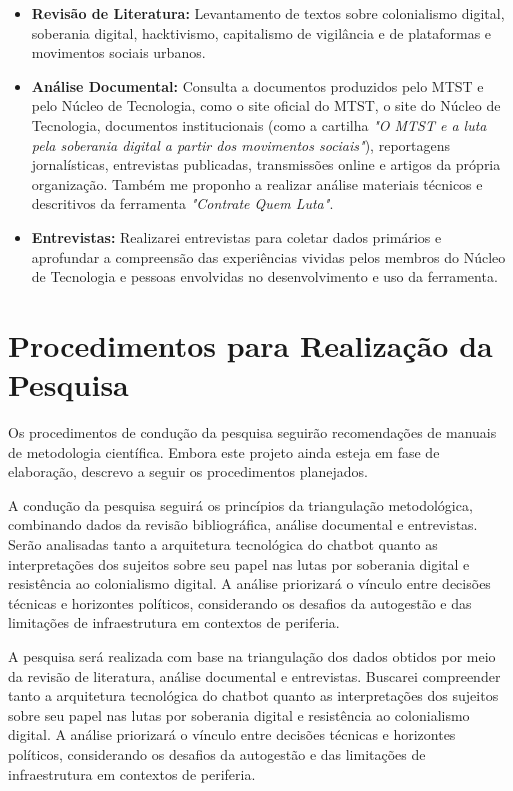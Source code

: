 \begin{itemize}

    \item \textbf{Revisão de Literatura:} Levantamento de textos sobre colonialismo digital, soberania digital, hacktivismo, capitalismo de vigilância e de plataformas e movimentos sociais urbanos.

    \item \textbf{Análise Documental:} Consulta a documentos produzidos pelo MTST e pelo Núcleo de Tecnologia, como o site oficial do MTST, o site do Núcleo de Tecnologia, documentos institucionais (como a cartilha \textit{"O MTST e a luta pela soberania digital a partir dos movimentos sociais"}), reportagens jornalísticas, entrevistas publicadas, transmissões online e artigos da própria organização. Também me proponho a realizar análise materiais técnicos e descritivos da ferramenta \textit{"Contrate Quem Luta"}.

    \item \textbf{Entrevistas:} Realizarei entrevistas para coletar dados primários e aprofundar a compreensão das experiências vividas pelos membros do Núcleo de Tecnologia e pessoas envolvidas no desenvolvimento e uso da ferramenta. 
\end{itemize}

\section{Procedimentos para Realização da Pesquisa}

Os procedimentos de condução da pesquisa seguirão recomendações de manuais de metodologia científica. Embora este projeto ainda esteja em fase de elaboração, descrevo a seguir os procedimentos planejados.

A condução da pesquisa seguirá os princípios da triangulação metodológica, combinando dados da revisão bibliográfica, análise documental e entrevistas. Serão analisadas tanto a arquitetura tecnológica do chatbot quanto as interpretações dos sujeitos sobre seu papel nas lutas por soberania digital e resistência ao colonialismo digital. A análise priorizará o vínculo entre decisões técnicas e horizontes políticos, considerando os desafios da autogestão e das limitações de infraestrutura em contextos de periferia.

A pesquisa será realizada com base na triangulação dos dados obtidos por meio da revisão de literatura, análise documental e entrevistas. Buscarei compreender tanto a arquitetura tecnológica do chatbot quanto as interpretações dos sujeitos sobre seu papel nas lutas por soberania digital e resistência ao colonialismo digital. A análise priorizará o vínculo entre decisões técnicas e horizontes políticos, considerando os desafios da autogestão e das limitações de infraestrutura em contextos de periferia.

